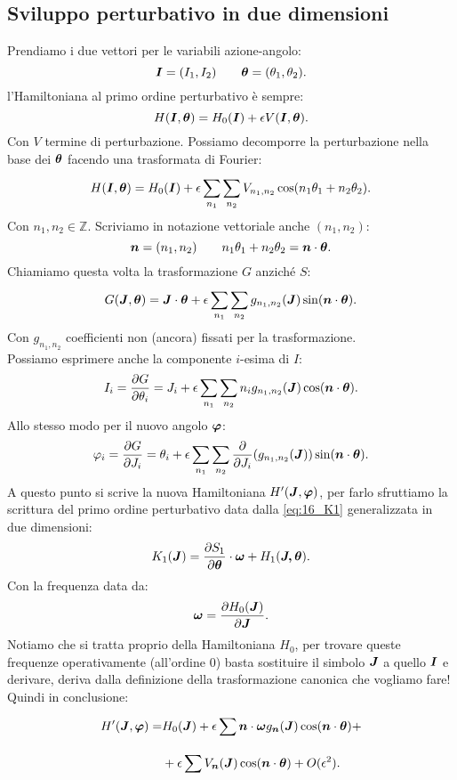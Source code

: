 \subsection{Sviluppo perturbativo in due dimensioni}%
\label{sub:Sviluppo perturbativo in due dimensioni}
Prendiamo i due vettori per le variabili azione-angolo:
\[
    \boldsymbol{I} = (I_1,I_2) \qquad \boldsymbol{\theta} = (\theta_1, \theta_2)
.\] 
l'Hamiltoniana al primo ordine perturbativo è sempre:
\[
    H(\boldsymbol{I}, \boldsymbol{\theta}) = H_0(\boldsymbol{I}) + \epsilon V(\boldsymbol{I}, \boldsymbol{\theta})
.\] 
Con $V$ termine di perturbazione. Possiamo decomporre la perturbazione nella base dei $\boldsymbol{\theta}$ facendo una trasformata di Fourier:
\[
    H(\boldsymbol{I}, \boldsymbol{\theta}) = H_0(\boldsymbol{I}) + \epsilon \sum_{n_1}^{} \sum_{n_2}^{} V_{n_1,n_2}\cos (n_1\theta_1+n_2\theta_2)
.\] 
Con $n_1,n_2 \in \mathbb{Z}$. Scriviamo in notazione vettoriale anche $ (n_1,n_2)$:
\[
    \boldsymbol{n} =(n_1,n_2) \qquad n_1\theta_1+n_2\theta_2 = \boldsymbol{n}\cdot \boldsymbol{\theta}
.\] 
Chiamiamo questa volta la trasformazione $G$ anziché $S$:
\[
    G(\boldsymbol{J}, \boldsymbol{\theta})=\boldsymbol{J}\cdot \boldsymbol{\theta} + \epsilon\sum_{ n_1}^{} \sum_{n_2}^{} g_{n_1,n_2}(\boldsymbol{J})\sin (\boldsymbol{n}\cdot \boldsymbol{\theta})
.\] 
Con $g_{n_1,n_2}$ coefficienti non (ancora) fissati per la trasformazione.\\
Possiamo esprimere anche la componente $i$-esima di $I$:
\[
    I_i = \frac{\partial G}{\partial \theta_i} =
    J_i + \epsilon\sum_{ n_1}^{} \sum_{n_2}^{} n_ig_{n_1,n_2}(\boldsymbol{J})\cos (\boldsymbol{n}\cdot \boldsymbol{\theta})
.\] 
Allo stesso modo per il nuovo angolo $\boldsymbol{\varphi}$:
\[
    \varphi_i = \frac{\partial G}{\partial J_i} =
    \theta_i + \epsilon  \sum_{n_1}^{} \sum_{n_2}^{} \frac{\partial }{\partial J_i} (g_{n_1,n_2}(\boldsymbol{J}))\sin (\boldsymbol{n}\cdot \boldsymbol{\theta})
.\] 
A questo punto si scrive la nuova Hamiltoniana $H'(\boldsymbol{J}, \boldsymbol{\varphi})$, per farlo sfruttiamo la scrittura del primo ordine perturbativo data dalla \ref{eq:16_K1} generalizzata in due dimensioni:
\[
    K_1(\boldsymbol{J})=\frac{\partial S_1}{\partial \boldsymbol{\theta}} \cdot \boldsymbol{\omega} + H_1(\boldsymbol{J,\boldsymbol{\theta}})
.\] 
Con la frequenza data da:
\[
    \boldsymbol{\omega} = \frac{\partial H_0(\boldsymbol{J})}{\partial \boldsymbol{J}} 
.\] 
Notiamo che si tratta proprio della Hamiltoniana $H_0$, per trovare queste frequenze operativamente (all'ordine 0) basta sostituire il simbolo $\boldsymbol{J}$ a quello $\boldsymbol{I}$ e derivare, deriva dalla definizione della trasformazione canonica che vogliamo fare!\\
Quindi in conclusione:
\[\begin{aligned}
    H'(\boldsymbol{J},\boldsymbol{\varphi}) = & 
    H_0(\boldsymbol{J}) + \epsilon  \sum_{}^{} \boldsymbol{n}\cdot \boldsymbol{\omega} g_{\boldsymbol{n}}(\boldsymbol{J})\cos (\boldsymbol{n}\cdot \boldsymbol{\theta}) +\\
				  & + \epsilon  \sum_{}^{} V_{\boldsymbol{n}}(\boldsymbol{J})\cos (\boldsymbol{n}\cdot \boldsymbol{\theta}) + O(\epsilon^2)
.\end{aligned}\]
